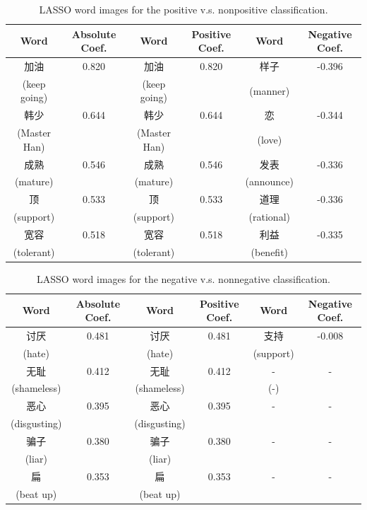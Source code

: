 \documentclass[11pt]{article}
\newcommand{\1}[1]{{\mathbf 1}\left\{#1\right\}}        %
\begin{document}
\begin{table}[!h]
\caption{LASSO word images for the positive v.s. nonpositive classification.}
\begin{center}
\begin{tabular}{|c|c||c|c||c|c|}
\hline
Word & Absolute Coef. & Word & Positive Coef. & Word & Negative Coef.\\ \hline \hline
加油 & 0.820 & 加油 & 0.820 & 样子 & -0.396\\
(keep going) & & (keep going) & & (manner) & \\\hline
韩少 & 0.644 & 韩少 & 0.644 & 恋 & -0.344\\
(Master Han) & & (Master Han) & & (love) & \\\hline
成熟 & 0.546 & 成熟 & 0.546 & 发表 & -0.336\\
(mature) & & (mature) & & (announce) & \\\hline
顶 & 0.533 & 顶 & 0.533 & 道理 & -0.336\\
(support) & & (support) & & (rational) & \\\hline
宽容 & 0.518 & 宽容 & 0.518 & 利益 & -0.335\\
(tolerant) & & (tolerant) & & (benefit) & \\\hline
\end{tabular}
\label{tb:lassopos}
\end{center}
\end{table}



\begin{table}[!h]
\caption{LASSO word images for the negative v.s. nonnegative classification.}
\begin{center}
\begin{tabular}{|c|c||c|c||c|c|}
\hline
Word & Absolute Coef. & Word & Positive Coef. & Word & Negative Coef.\\ \hline \hline
讨厌 & 0.481 & 讨厌 & 0.481 & 支持 & -0.008\\
(hate) & & (hate) & & (support) & \\\hline
无耻 & 0.412 & 无耻 & 0.412 & - & -\\
(shameless) & & (shameless) & & (-) & \\\hline
恶心 & 0.395 & 恶心 & 0.395 & - & -\\
(disgusting) & & (disgusting) & &  & \\\hline
骗子 & 0.380 & 骗子 & 0.380 & - & -\\
(liar) & & (liar) & &  & \\\hline
扁 & 0.353 & 扁 & 0.353 & - & -\\
(beat up) & & (beat up) & &  & \\\hline
\end{tabular}
\label{tb:lassoneg}
\end{center}
\end{table}
\end{document}
